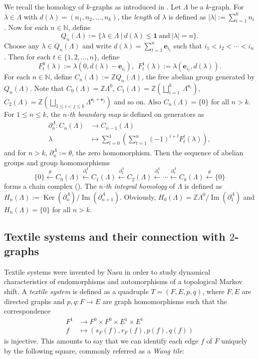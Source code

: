 \documentclass[a4paper,reqno,12pt]{amsart}
\theoremstyle{definition}
\theoremstyle{remark}
\newcommand{\image}{\operatorname{Im}}
\newcommand{\Ker}{\operatorname{Ker}}
\begin{document}
We recall the homology of $k$-graphs as introduced in \cite{HomKPS}. Let $\Lambda$ be a $k$-graph. For $\lambda\in \Lambda$ with $d(\lambda)=(n_1,n_2,\ldots,n_k)$, the \emph{length} of $\lambda$ is defined as $|\lambda|:=\displaystyle{\sum_{i=1}^{k}}n_i$. Now for each $n\in \mathbb{N}$, define \[Q_n(\Lambda):=\{\lambda\in \Lambda~|~d(\lambda)\le \mathbf{1}~\text{and}~|\lambda|=n\}.\] Choose any $\lambda\in Q_n(\Lambda)$ and write $d(\lambda)=\displaystyle{\sum_{t=1}^{n}}\mathbf{e}_{i_t}$ such that $i_1< i_2 <\cdots < i_n$. Then for each $t\in \{1,2,\ldots,n\}$, define \[F_t^0(\lambda):=\lambda(0,d(\lambda)-\mathbf{e}_{i_t}),~~F_t^1(\lambda):=\lambda(\mathbf{e}_{i_t},d(\lambda)).\] For each $n\in \mathbb{N}$, define $C_n(\Lambda):=\mathbb{Z}Q_n(\Lambda)$, the free abelian group generated by $Q_n(\Lambda)$. Note that $C_0(\Lambda)=\mathbb{Z}\Lambda^0$, $C_1(\Lambda)=\mathbb{Z}\left(\displaystyle{\bigsqcup_{i=1}^{k}}~\Lambda^{\mathbf{e}_i}\right)$, $C_2(\Lambda)=\mathbb{Z}\left(\displaystyle{\bigsqcup_{1\le i<j\le k}}\Lambda^{\mathbf{e}_i+\mathbf{e}_j}\right)$ and so on. Also $C_n(\Lambda)=\{0\}$ for all $n>k$. For $1\le n\le k$, the \emph{$n$-th boundary map} is defined on generators as 
\begin{align*}
\partial_n^\Lambda:C_n(\Lambda)&\longrightarrow C_{n-1}(\Lambda)\\
\lambda&\longmapsto \displaystyle{\sum_{l=0}^{1}}\left(\displaystyle{\sum_{t=1}^{n}}(-1)^{i+l}F_t^l(\lambda)\right),
\end{align*}
and for $n> k$, $\partial_n^\Lambda:=\theta$, the zero homomorphism. Then the sequence of abelian groups and group homomorphisms \[\{0\}\overset{\theta}{\longleftarrow} C_0(\Lambda)\overset{\partial_1^\Lambda}{\longleftarrow} C_1(\Lambda)\overset{\partial_2^\Lambda}{\longleftarrow} C_2(\Lambda)\overset{\partial_3^\Lambda}{\longleftarrow}\cdots \overset{\partial_k^\Lambda}{\longleftarrow} C_k(\Lambda)\overset{\theta}{\longleftarrow} \{0\}\] forms a chain complex (\cite[Lemma 3.3]{HomKPS}). The \emph{$n$-th integral homology} of $\Lambda$ is defined as $H_n(\Lambda):=\Ker(\partial_n^\Lambda)/\image(\partial_{n+1}^\Lambda)$. Obviously, $H_0(\Lambda)=\mathbb{Z}\Lambda^0/\image(\partial_1^\Lambda)$ and $H_n(\Lambda)=\{0\}$ for all $n>k$. 

\subsection{Textile systems and their connection with $2$-graphs}\label{ssec textile systems and 2-graphs}
Textile systems were invented by Nasu \cite{Nasu} in order to study dynamical characteristics of endomorphisms and automorphisms of a topological Markov shift. A \emph{textile system} is defined as a quadruple $T=(F,E,p,q)$, where $F,E$ are directed graphs and $p,q:F\longrightarrow E$ are graph homomorphisms such that the correspondence 
\begin{align*}
    F^1 &\longrightarrow F^0\times F^0 \times E^1\times E^1\\
    f &\longmapsto (s_F(f),r_F(f),p(f),q(f))
\end{align*}
is injective. This amounts to say that we can identify each edge $f$ of $F$ uniquely by the following square, commonly referred as a \emph{Wang tile}:
\end{document}

